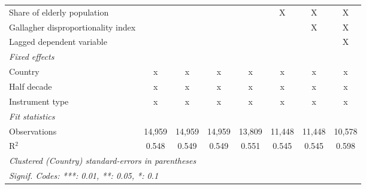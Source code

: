 \begin{tabular}{lccccccc}
   Share of elderly population                                    &                &               &               &               & X              & X              & X\\  
   Gallagher disproportionality index                             &                &               &               &               &                & X              & X\\  
   Lagged dependent variable                                      &                &               &               &               &                &                & X\\  
   \emph{Fixed effects}\\
   Country                                                        & x              & x             & x             & x             & x              & x              & x\\  
   Half decade                                                    & x              & x             & x             & x             & x              & x              & x\\  
   Instrument type                                                & x              & x             & x             & x             & x              & x              & x\\  
   \midrule \emph{Fit statistics}\\
   Observations                                                   & 14,959         & 14,959        & 14,959        & 13,809        & 11,448         & 11,448         & 10,578\\  
   R$^2$                                                          & 0.548          & 0.549         & 0.549         & 0.551         & 0.545          & 0.545          & 0.598\\  
   \midrule
   \multicolumn{8}{l}{\emph{Clustered (Country) standard-errors in parentheses}}\\
   \multicolumn{8}{l}{\emph{Signif. Codes: ***: 0.01, **: 0.05, *: 0.1}}\\
\end{tabular}
\par\endgroup


